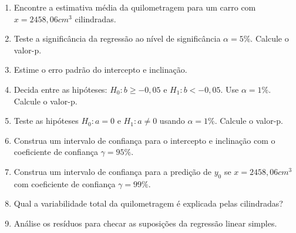 \documentclass[12pt, a4paper]{article}
\begin{document}
\begin{enumerate}
\begin{enumerate}
		\item Encontre a estimativa média da quilometragem para um carro com $x=2458,06 cm^3$ cilindradas.
		\item Teste a significância da regressão ao nível de significância $\alpha=5\%$. Calcule o valor-p.
		\item Estime o erro padrão do intercepto e inclinação.
		\item Decida entre as hipóteses: $H_0: b \geq -0,05$ e $H_1: b < -0,05$. Use $\alpha=1\%$. Calcule o valor-p.
		\item Teste as hipóteses $H_0:a=0$ e $H_1: a \neq 0$ usando $\alpha=1\%$. Calcule o valor-p. 
		\item Construa um intervalo de confiança para o intercepto e inclinação com o coeficiente de confiança $\gamma=95\%$.
		\item Construa um intervalo de confiança para a predição de $y_0$ se $x=2458,06 cm^3$ com coeficiente de confiança $\gamma=99\%$.
		\item Qual a variabilidade total da quilometragem é explicada pelas cilindradas?
		\item Análise os resíduos para checar as suposições da regressão linear simples.
	\end{enumerate}


\end{enumerate}
\end{document}
